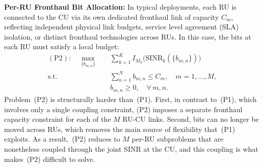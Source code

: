 \documentclass[10pt, twocolumn, comsoc]{IEEEtran}
\begin{document}

{\textbf{{Per-RU Fronthaul Bit Allocation:}}}
In typical deployments, each RU is connected to the 
CU via its own dedicated fronthaul link of capacity 
$C_m$, reflecting independent physical link budgets, service level agreement (SLA) isolation, or distinct fronthaul technologies across RUs.
In this case, the bits at each RU must satisfy a local budget:
\begin{align} \label{eq:problem_per_ru}
  \mathrm{(P2):} \quad 
  \max_{\{b_{m,n}\}} 
  \quad & \sum_{k=1}^{K} 
        I_{M_k} \big(\mathrm{SINR}_k(\{b_{m,n}\})\big) 
        \nonumber \\
  \mathrm{s.t.} 
  \quad & \sum_{n=1}^{N} b_{m,n} \leq C_m, 
        \quad m = 1, \dots, M, \\
  & b_{m,n} \geq 0, 
        \quad \forall\, m, n. \nonumber
\end{align}
Problem~(P2) is structurally harder than~(P1).
First, in contrast to~(P1), which involves only a single coupling constraint, (P2) imposes a separate fronthaul capacity constraint for each of the 
$M$ RU-CU links.
Second, bits can no longer be moved across RUs, which removes the main source of flexibility that~(P1) exploits. As a result,~(P2) reduces to $M$ per-RU subproblems that are nonetheless coupled through the joint SINR at the CU, and this coupling is what makes~(P2) difficult to solve.


\end{document}
